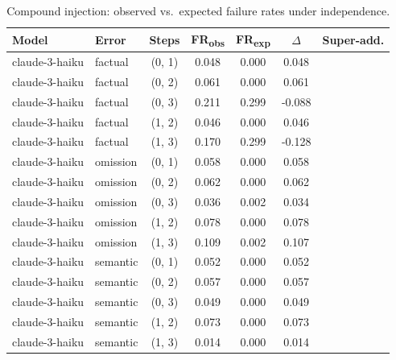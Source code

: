 \begin{table}[t]
\centering
\caption{Compound injection: observed vs.\ expected failure rates under independence.}
\label{tab:compound}
\begin{tabular}{llccccc}
\toprule
Model & Error & Steps & FR\textsubscript{obs} & FR\textsubscript{exp} & $\Delta$ & Super-add. \\
\midrule
claude-3-haiku & factual & (0, 1) & 0.048 & 0.000 & 0.048 &  \\
claude-3-haiku & factual & (0, 2) & 0.061 & 0.000 & 0.061 &  \\
claude-3-haiku & factual & (0, 3) & 0.211 & 0.299 & -0.088 &  \\
claude-3-haiku & factual & (1, 2) & 0.046 & 0.000 & 0.046 &  \\
claude-3-haiku & factual & (1, 3) & 0.170 & 0.299 & -0.128 &  \\
claude-3-haiku & omission & (0, 1) & 0.058 & 0.000 & 0.058 &  \\
claude-3-haiku & omission & (0, 2) & 0.062 & 0.000 & 0.062 &  \\
claude-3-haiku & omission & (0, 3) & 0.036 & 0.002 & 0.034 &  \\
claude-3-haiku & omission & (1, 2) & 0.078 & 0.000 & 0.078 &  \\
claude-3-haiku & omission & (1, 3) & 0.109 & 0.002 & 0.107 &  \\
claude-3-haiku & semantic & (0, 1) & 0.052 & 0.000 & 0.052 &  \\
claude-3-haiku & semantic & (0, 2) & 0.057 & 0.000 & 0.057 &  \\
claude-3-haiku & semantic & (0, 3) & 0.049 & 0.000 & 0.049 &  \\
claude-3-haiku & semantic & (1, 2) & 0.073 & 0.000 & 0.073 &  \\
claude-3-haiku & semantic & (1, 3) & 0.014 & 0.000 & 0.014 &  \\
\bottomrule
\end{tabular}
\end{table}